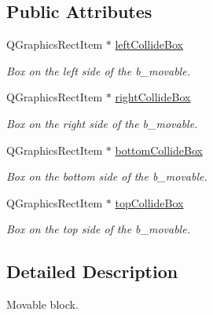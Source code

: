 \subsection*{Public Attributes}
\begin{DoxyCompactItemize}
\item 
\hypertarget{class_b___movable_a7ab41c3e35cebd0d3ceb7c5e81ed61b8}{}Q\+Graphics\+Rect\+Item $\ast$ \hyperlink{class_b___movable_a7ab41c3e35cebd0d3ceb7c5e81ed61b8}{left\+Collide\+Box}\label{class_b___movable_a7ab41c3e35cebd0d3ceb7c5e81ed61b8}

\begin{DoxyCompactList}\small\item\em Box on the left side of the b\+\_\+movable. \end{DoxyCompactList}\item 
\hypertarget{class_b___movable_a197fc74b228c304f1f88e0670c1b3dcc}{}Q\+Graphics\+Rect\+Item $\ast$ \hyperlink{class_b___movable_a197fc74b228c304f1f88e0670c1b3dcc}{right\+Collide\+Box}\label{class_b___movable_a197fc74b228c304f1f88e0670c1b3dcc}

\begin{DoxyCompactList}\small\item\em Box on the right side of the b\+\_\+movable. \end{DoxyCompactList}\item 
\hypertarget{class_b___movable_a179bdd1cda40cb2bb81035420ad58c61}{}Q\+Graphics\+Rect\+Item $\ast$ \hyperlink{class_b___movable_a179bdd1cda40cb2bb81035420ad58c61}{bottom\+Collide\+Box}\label{class_b___movable_a179bdd1cda40cb2bb81035420ad58c61}

\begin{DoxyCompactList}\small\item\em Box on the bottom side of the b\+\_\+movable. \end{DoxyCompactList}\item 
\hypertarget{class_b___movable_a455a8c29d95faab500eb13a996a387ce}{}Q\+Graphics\+Rect\+Item $\ast$ \hyperlink{class_b___movable_a455a8c29d95faab500eb13a996a387ce}{top\+Collide\+Box}\label{class_b___movable_a455a8c29d95faab500eb13a996a387ce}

\begin{DoxyCompactList}\small\item\em Box on the top side of the b\+\_\+movable. \end{DoxyCompactList}\end{DoxyCompactItemize}


\subsection{Detailed Description}
Movable block. 


